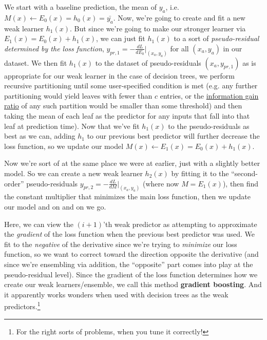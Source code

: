 \documentclass[letterpaper,12pt]{report}
\begin{document}
We start with a baseline prediction, the mean of \(y_a\), i.e. 
\(M(x) \leftarrow E_0(x) = h_0(x) = \bar{y_a}\).
Now, we're going to create and fit a new weak learner \(h_1(x)\). But since we're going to
make our stronger learner via \(E_1(x) = E_0(x) + h_1(x)\), we can just fit \(h_1(x)\)
to a sort of \emph{pseudo-residual determined by the loss function}, 
\(y_{pr,1} = - \frac{dL}{dE_0} \Bigr|_{\left(x_a, y_a\right)}\) 
for all \(\left(x_a, y_a\right)\) in our dataset. 
We then fit \(h_1(x)\) to the dataset of
pseudo-residuals \((x_a, y_{pr,1})\) as is appropriate for our weak learner \textemdash{}
in the case of decision trees, we perform recursive partitioning until some 
user-specified condition is met (e.g. any further partitioning would yield leaves with
fewer than \(c\) entries, or the \href{https://en.wikipedia.org/wiki/Information_gain_ratio}
{information gain ratio} of any such partition would be smaller
than some threshold) and then taking the mean of each leaf as the predictor for any
inputs that fall into that leaf at prediction time).
Now that we've fit \(h_1(x)\) to the pseudo-residuals as best as we can, adding \(h_1\) to our
previous best predictor will further decrease the loss function, so we 
update our model \(M(x) \leftarrow E_1(x) = E_0(x) + h_1(x)\). 

Now we're sort of at the same place we were at earlier, just with a slightly better model.
So we can create a new weak learner \(h_2(x)\) by fitting it to the ``second-order''
pseudo-residuals \(y_{pr,2} = - \frac{dL}{dM} \Bigr|_{\left(x_a, y_a\right)}\) 
(where now \(M = E_1(x)\)),
then find the constant multiplier that minimizes the
main loss function, then we update our model \textemdash and on and on we go.

Here, we can view the \((i+1)\)'th weak predictor as attempting 
to approximate the \emph{gradient}
of the loss function when the previous best predictor was used.
We fit to the \emph{negative} of the derivative since we're trying to \emph{minimize}
our loss function, so we want to correct toward the direction opposite the derivative
(and since we're ensembling via addition, the ``opposite'' part comes into play
at the pseudo-residual level).
Since the gradient of the loss function determines how we create our weak learners/ensemble, 
we call this method \textbf{gradient boosting}. And it apparently works wonders
when used with decision trees as the weak predictors.\footnote{
  For the right sorts of problems, when you tune it correctly!
  }
\end{document}
